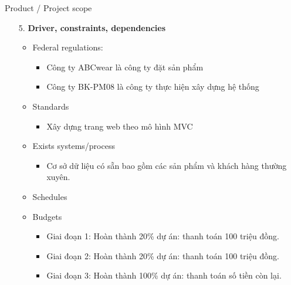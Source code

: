 \documentclass[compress]{beamer}
\begin{document}
\begin{frame}{Product / Project scope}
\begin{itemize}
\item[5. ] \textbf{Driver, constraints, dependencies}
\begin{itemize}
\item Federal regulations:
\begin{itemize}
\item Công ty ABCwear là công ty đặt sản phẩm
\item Công ty BK-PM08 là công ty thực hiện xây dựng hệ thống
\end{itemize}
\item Standards
\begin{itemize}
\item Xây dựng trang web theo mô hình MVC
\end{itemize}
\item Exists systems/process
\begin{itemize}
\item Cơ sở dữ liệu có sẵn bao gồm các sản phẩm và khách hàng thường xuyên.
\end{itemize}
\item Schedules
\item Budgets
\begin{itemize}
\item Giai đoạn 1: Hoàn thành 20\% dự án: thanh toán 100 triệu đồng.
\item Giai đoạn 2: Hoàn thành 20\% dự án: thanh toán 100 triệu đồng.
\item Giai đoạn 3: Hoàn thành 100\% dự án: thanh toán số tiền còn lại.
\end{itemize}
\end{itemize}
\end{itemize}
\end{frame}
\end{document}
